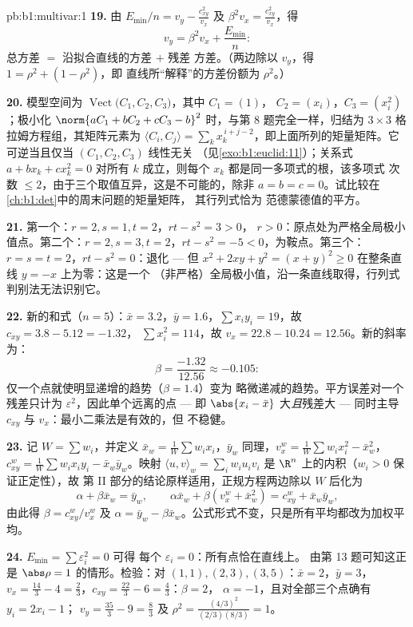 \begin{solution}{pb:b1:multivar:1}
\textbf{19.} 由 $E_{\min}/n = v_y - \frac{c_{xy}^2}{v_x}$ 及
$\beta^2 v_x = \frac{c_{xy}^2}{v_x}$，得
\[
v_y = \beta^2 v_x + \frac{E_{\min}}n :
\]
总方差 $=$ 沿拟合直线的方差 $+$ 残差
方差。（两边除以 $v_y$，得 $1 = \rho^2 + (1 - \rho^2)$，即
直线所“解释”的方差份额为 $\rho^2$。）

\textbf{20.} 模型空间为
$\operatorname{Vect}\bigl(C_1, C_2, C_3\bigr)$，其中 $C_1 = (1)$，
$C_2 = (x_i)$，$C_3 = (x_i^2)$；极小化 $\norm{aC_1 + bC_2 +
cC_3 - b}^2$ 时，与第 8 题完全一样，归结为 $3\times3$
格拉姆方程组，其矩阵元素为 $\langle C_i, C_j\rangle =
\sum_k x_k^{\,i+j-2}$，即上面所列的矩量矩阵。它
可逆当且仅当 $(C_1, C_2, C_3)$ 线性无关
（见\cref{exo:b1:euclid:11}）；关系式 $a + bx_k + cx_k^2 = 0$
对所有 $k$ 成立，则每个 $x_k$ 都是同一多项式的根，该多项式
次数 $\leq 2$，由于三个取值互异，这是不可能的，除非 $a
= b = c = 0$。试比较在\cref{ch:b1:det}中的周末问题的矩量矩阵，
其行列式恰为
范德蒙德值的平方。

\textbf{21.} 第一个：$r = 2, s = 1, t = 2$，$rt - s^2 = 3 > 0$，
$r > 0$：原点处为严格全局极小值点。第二个：$r = 2, s
= 3, t = 2$，$rt - s^2 = -5 < 0$，为鞍点。第三个：$r = s = t =
2$，$rt - s^2 = 0$：退化 --- 但 $x^2 + 2xy + y^2 = (x +
y)^2 \geq 0$ 在整条直线 $y = -x$ 上为零：这是一个
（非严格）全局极小值，沿一条直线取得，行列式
判别法无法识别它。

\textbf{22.} 新的和式（$n = 5$）：$\bar x = 3.2$，$\bar y =
1.6$，$\sum x_iy_i = 19$，故 $c_{xy} = 3.8 - 5.12 = -1.32$，
$\sum x_i^2 = 114$，故 $v_x = 22.8 - 10.24 = 12.56$。新的斜率为：
\[
\beta = \frac{-1.32}{12.56} \approx -0.105 :
\]
仅一个点就使明显递增的趋势（$\beta = 1.4$）变为
略微递减的趋势。平方误差对一个残差只计为
$\varepsilon^2$，因此单个远离的点 --- 即
$\abs{x_{i} - \bar x}$ 大\emph{且}残差大 --- 同时主导
$c_{xy}$ 与 $v_x$：最小二乘法是有效的，但
不稳健。

\textbf{23.} 记 $W = \sum w_i$，并定义 $\bar x_w =
\frac1W\sum w_ix_i$，$\bar y_w$ 同理，$v_x^w = \frac1W\sum
w_ix_i^2 - \bar x_w^2$，$c^w_{xy} = \frac1W\sum w_ix_iy_i - \bar
x_w\bar y_w$。映射 $\langle u, v\rangle_w = \sum_i w_iu_iv_i$
是 $\R^n$ 上的内积（$w_i > 0$ 保证正定性），故
第 II 部分的结论原样适用，正规方程两边除以 $W$
后化为
\[
\alpha + \beta\bar x_w = \bar y_w,
\qquad
\alpha\bar x_w + \beta(v^w_x + \bar x_w^2) = c^w_{xy} + \bar
x_w\bar y_w ,
\]
由此得 $\beta = c^w_{xy}/v^w_x$ 及 $\alpha = \bar y_w -
\beta\bar x_w$。公式形式不变，只是所有平均都改为加权平均。

\textbf{24.} $E_{\min} = \sum\varepsilon_i^2 = 0$ 可得
每个 $\varepsilon_i = 0$：所有点恰在直线上。
由第 13 题可知这正是 $\abs\rho = 1$ 的情形。检验：对 $(1,1), (2,3),
(3,5)$：$\bar x = 2$，$\bar y = 3$，$v_x = \frac{14}3 - 4 =
\frac23$，$c_{xy} = \frac{22}3 - 6 = \frac43$：$\beta = 2$，
$\alpha = -1$，且对全部三个点确有 $y_i = 2x_i - 1$；
$v_y = \frac{35}3 - 9 = \frac83$ 及 $\rho^2 =
\frac{(4/3)^2}{(2/3)(8/3)} = 1$。


\end{solution}
